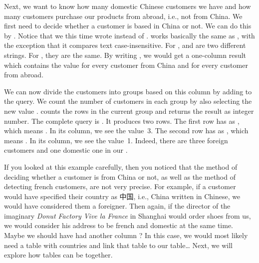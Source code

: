 Next, we want to know how many domestic Chinese customers we have and how many customers purchase our products from abroad, i.e., not from China.
We first need to decide whether a customer is based in China or not.
We can do this by .
Notice that we this time wrote  instead of .
 works basically the same as , with the exception that it compares text case-insensitive.
For ,  and  are two different strings.
For , they are the same.
By writing , we would get a one-column result which contains the value  for every customer from China and  for every customer from abroad.%
%
\begin{sloppypar}%
We can now divide the customers into groups based on this column  by adding  to the query.
We count the number of customers in each group by also selecting the new value .
 counts the rows in the current group and returns the result as integer number.
The complete query is .
It produces two rows.
The first row has  as , which means .
In its  column, we see the value~3.
The second row has  as , which means .
In its  column, we see the value~1.
Indeed, there are three foreign customers and one domestic one in our \db.%
\end{sloppypar}%
%
If you looked at this example carefully, then you noticed that the method of deciding whether a customer is from China or not, as well as the method of detecting french customers, are not very precise.
For example, if a customer would have specified their country as 中国, i.e., China written in Chinese, we would have considered them a foreigner.
Then again, if the director of the imaginary \emph{Donut Factory Vive la France} in Shanghai would order shoes from us, we would consider his address to be french and domestic at the same time.
Maybe we should have had another column ?
In this case, we would most likely need a table with countries and link that table to our  table\dots
Next, we will explore how tables can be  together.%
